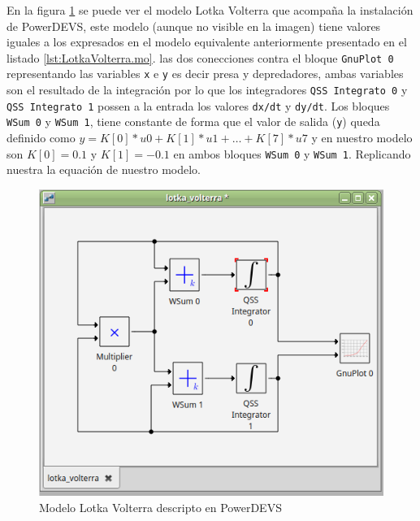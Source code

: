 	En la figura \ref{fig:lk-powerdevs} se puede ver el modelo Lotka Volterra que acompaña la instalación de PowerDEVS, este modelo (aunque no visible en la imagen)
	tiene valores iguales a los expresados en el modelo equivalente anteriormente presentado en el listado \ref{lst:LotkaVolterra.mo}. 
	las dos conecciones contra el bloque \texttt{GnuPlot 0} representando las variables \texttt{x} e \texttt{y} es decir presa y depredadores, ambas variables 
	son el resultado de la integración por lo que los integradores \texttt{QSS Integrato 0} y \texttt{QSS Integrato 1} possen a la entrada los valores
	\texttt{dx/dt} y \texttt{dy/dt}. Los bloques \texttt{WSum 0} y \texttt{WSum 1}, tiene constante de forma que el valor de salida (\texttt{y}) queda definido como
	$y = K[0] * u0 + K[1] * u1 + \dots + K[7] * u7$ y en nuestro modelo son $K[0] = 0.1$ y $K[1] = -0.1$ en ambos bloques \texttt{WSum 0} y \texttt{WSum 1}.
	Replicando nuestra la equación de nuestro modelo.
	

	\begin{figure}[!htbp]
	  \includegraphics[width=\textwidth]{lk-powerdevs}
	  \caption{Modelo Lotka Volterra descripto en PowerDEVS}
	   \label{fig:lk-powerdevs}
	\end{figure}

